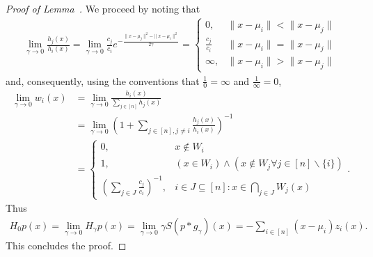 \documentclass{article}
\theoremstyle{plain}
\theoremstyle{definition}
\theoremstyle{remark}
\newcommand{\sumi}{\sum_{i\in[n]}}
\begin{document}
\begin{proof}[Proof of Lemma~]
     We proceed by noting that
    \begin{align*}
        \lim_{\gamma\to 0}\frac{h_j(x)}{h_i(x)}
        =\lim_{\gamma\to 0}\tfrac{c_j}{c_i}e^{-\frac{\|x-\mu_j\|^2-\|x-\mu_i\|^2}{2\gamma}}
        =\begin{cases}
            0, & \|x-\mu_i\| < \|x-\mu_j\|\\
            \tfrac{c_j}{c_i} & \|x-\mu_i\| = \|x-\mu_j\|\\
            \infty, & \|x-\mu_i\| > \|x-\mu_j\|
        \end{cases}
    \end{align*}
    and, consequently, using the conventions that $\tfrac{1}{0}=\infty$ and $\tfrac{1}{\infty}=0$,
    \begin{align*}
        \lim_{\gamma\to 0} w_i(x)
        &=\lim_{\gamma\to 0}\frac{h_i(x)}{\sum_{j\in[n]}h_j(x)}\\
        &=\lim_{\gamma\to 0}\left( 1+ \sum_{j\in[n],j\neq i}\frac{h_j(x)}{h_i(x)}\right)^{-1}\\
        &=\begin{cases}
            0, & x\notin W_i\\
            1, & (x\in W_i) \wedge (x\notin W_j \forall j\in[n]\backslash\{i\})\\
            (\sum_{j\in J}\tfrac{c_j}{c_i})^{-1}, & i\in J\subseteq[n]\colon x\in\bigcap_{j\in J}W_j(x)
        \end{cases}.
    \end{align*}
Thus 
\begin{align*}
    H_0p(x)=\lim_{\gamma\to 0}H_\gamma p(x)= \lim_{\gamma\to 0}\gamma S(p*g_\gamma)(x)=-\sumi (x-\mu_i)z_i(x).
\end{align*}
This concludes the proof.
\end{proof}
\end{document}
